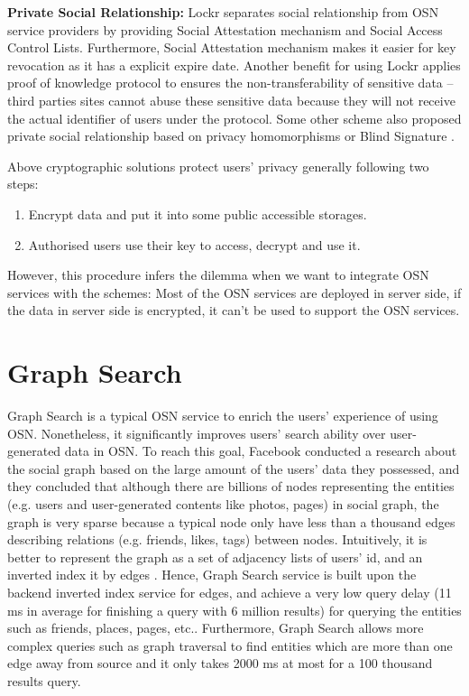 {\bf Private Social Relationship: } Lockr \cite{tootoonchian2009lockr} separates social relationship from OSN service providers by providing Social Attestation mechanism and Social Access Control Lists. Furthermore, Social Attestation mechanism makes it easier for key revocation as it has a explicit expire date. Another benefit for using Lockr applies proof of knowledge protocol to ensures the non-transferability of sensitive data -- third parties sites cannot abuse these sensitive data because they will not receive the actual identifier of users under the protocol. Some other scheme also proposed private social relationship based on privacy homomorphisms \cite{domingo2008privacy} or Blind Signature \cite{de2012hummingbird}.
 
Above cryptographic solutions protect users' privacy generally following two steps:
\begin{enumerate}
\item Encrypt data and put it into some public accessible storages.
\item Authorised users use their key to access, decrypt and use it.
\end{enumerate}
However, this procedure infers the dilemma when we want to integrate OSN services with the schemes: Most of the OSN services are deployed in server side, if the data in server side is encrypted, it can't be used to support the OSN services.

\section{Graph Search}
Graph Search \cite{facebook2013graph} is a typical OSN service to enrich the users' experience of using OSN. Nonetheless, it significantly improves users' search ability over user-generated data in OSN. To reach this goal, Facebook conducted a research about the social graph based on the large amount of the users' data they possessed, and they concluded that although there are billions of nodes representing the entities (e.g. users and user-generated contents like photos, pages) in social graph, the graph is very sparse because a typical node only have less than a thousand edges describing relations (e.g. friends, likes, tags) between nodes. Intuitively, it is better to represent the graph as a set of adjacency lists of users' id, and an inverted index it by edges \cite{curtiss2013unicorn}. Hence, Graph Search service is built upon the backend inverted index service for edges, and achieve a very low query delay (11 ms in average for finishing a query with 6 million results) for querying the entities such as friends, places, pages, etc.. Furthermore, Graph Search allows more complex queries such as graph traversal to find entities which are more than one edge away from source and it only takes 2000 ms at most for a 100 thousand results query. 

